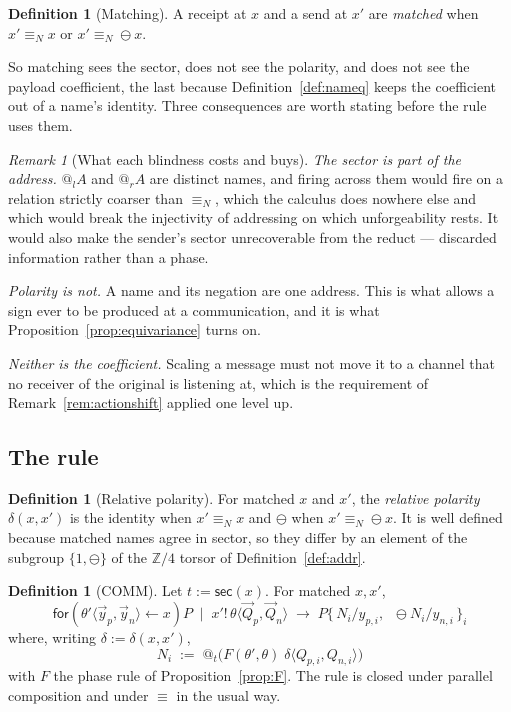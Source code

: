 \documentclass[11pt]{article}
\makeatletter
\theoremstyle{definition}
\newtheorem{definition}[theorem]{Definition}
\theoremstyle{remark}
\newtheorem{remark}[theorem]{Remark}
\newcommand{\quo}[1]{\ensuremath{@_{#1}}}
\newcommand{\dip}[2]{\ensuremath{\langle #1 , #2 \rangle}}
\newcommand{\negop}{\ensuremath{\ominus}}
\newcommand{\sect}[1]{\ensuremath{\mathsf{sec}(#1)}}
\newcommand{\scong}{\ensuremath{\equiv}}
\newcommand{\nameq}{\ensuremath{\equiv_{N}}}
\newcommand{\red}{\ensuremath{\rightarrow}}
\makeatother
\begin{document}
\begin{definition}[Matching]
\label{def:match}
A receipt at $x$ and a send at $x'$ are \emph{matched} when $x' \nameq x$ or
$x' \nameq \negop x$.
\end{definition}

So matching sees the sector, does not see the polarity, and does not see the
payload coefficient, the last because Definition~\ref{def:nameq} keeps the
coefficient out of a name's identity. Three consequences are worth stating
before the rule uses them.

\begin{remark}[What each blindness costs and buys]
\label{rem:notsectorblind}
\emph{The sector is part of the address.} $\quo{l}A$ and $\quo{r}A$ are distinct
names, and firing across them would fire on a relation strictly coarser than
$\nameq$, which the calculus does nowhere else and which would break the
injectivity of addressing on which unforgeability rests. It would also make the
sender's sector unrecoverable from the reduct --- discarded information rather
than a phase.

\emph{Polarity is not.} A name and its negation are one address. This is what
allows a sign ever to be produced at a communication, and it is what
Proposition~\ref{prop:equivariance} turns on.

\emph{Neither is the coefficient.} Scaling a message must not move it to a
channel that no receiver of the original is listening at, which is the
requirement of Remark~\ref{rem:actionshift} applied one level up.
\end{remark}

\subsection{The rule}

\begin{definition}[Relative polarity]
\label{def:relpol}
For matched $x$ and $x'$, the \emph{relative polarity} $\delta(x,x')$ is the
identity when $x' \nameq x$ and $\negop$ when $x' \nameq \negop x$. It is well
defined because matched names agree in sector, so they differ by an element of
the subgroup $\{1, \negop\}$ of the $\mathbb{Z}/4$ torsor of
Definition~\ref{def:addr}.
\end{definition}

\begin{definition}[COMM]
\label{def:comm}
Let $t := \sect{x}$. For matched $x, x'$,
\[
  \mathsf{for}(\theta'\dip{\vec{y}_p}{\vec{y}_n} \leftarrow x)P \;\mid\;
  x'!\,\theta\dip{\vec{Q}_p}{\vec{Q}_n}
  \;\red\;
  P\{\, N_i / y_{p,i}, \;\; \negop N_i / y_{n,i} \,\}_{i}
\]
where, writing $\delta := \delta(x,x')$,
\[
  N_i \;:=\; \quo{t}\bigl(F(\theta',\theta)\; \delta \dip{Q_{p,i}}{Q_{n,i}}\bigr)
\]
with $F$ the phase rule of Proposition~\ref{prop:F}. The rule is closed under
parallel composition and under $\scong$ in the usual way.
\end{definition}
\end{document}
